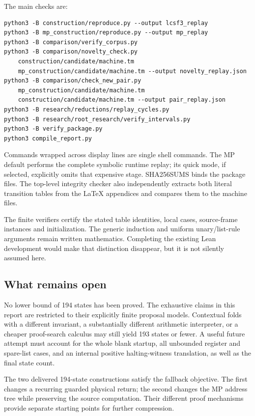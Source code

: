 \documentclass[10pt,a4paper]{article}
\begin{document}
The main checks are:

\begin{verbatim}
python3 -B construction/reproduce.py --output lcsf3_replay
python3 -B mp_construction/reproduce.py --output mp_replay
python3 -B comparison/verify_corpus.py
python3 -B comparison/novelty_check.py 
    construction/candidate/machine.tm 
    mp_construction/candidate/machine.tm --output novelty_replay.json
python3 -B comparison/check_new_pair.py 
    mp_construction/candidate/machine.tm 
    construction/candidate/machine.tm --output pair_replay.json
python3 -B research/reductions/replay_cycles.py
python3 -B research/root_research/verify_intervals.py
python3 -B verify_package.py
python3 compile_report.py
\end{verbatim}

Commands wrapped across display lines are single shell commands. The MP default performs the complete symbolic runtime replay; its quick mode, if selected, explicitly omits that expensive stage. SHA256SUMS binds the package files. The top-level integrity checker also independently extracts both literal transition tables from the LaTeX appendices and compares them to the machine files.

The finite verifiers certify the stated table identities, local cases, source-frame instances and initialization. The generic induction and uniform unary/list-rule arguments remain written mathematics. Completing the existing Lean development would make that distinction disappear, but it is not silently assumed here.

\subsection{What remains open}\label{what-remains-open}

No lower bound of 194 states has been proved. The exhaustive claims in this report are restricted to their explicitly finite proposal models. Contextual folds with a different invariant, a substantially different arithmetic interpreter, or a cheaper proof-search calculus may still yield 193 states or fewer. A useful future attempt must account for the whole blank startup, all unbounded register and spare-list cases, and an internal positive halting-witness translation, as well as the final state count.

The two delivered 194-state constructions satisfy the fallback objective. The first changes a recurring guarded physical return; the second changes the MP address tree while preserving the source computation. Their different proof mechanisms provide separate starting points for further compression.
\end{document}
